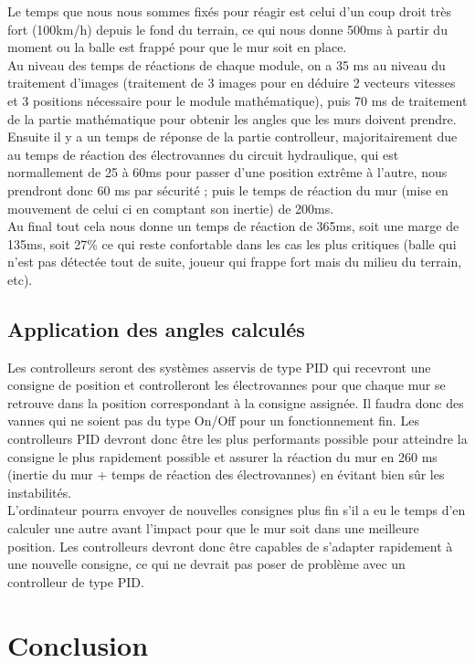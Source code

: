 Le temps que nous nous sommes fixés pour réagir est celui d'un coup droit très fort (100km/h) depuis le fond du terrain, ce qui nous donne 500ms à partir du moment ou la balle est frappé pour que le mur soit en place. \\
Au niveau des temps de réactions de chaque module, on a 35 ms au niveau du traitement d'images (traitement de 3 images pour en déduire 2 vecteurs vitesses et 3 positions nécessaire pour le module mathématique), puis 70 ms de traitement de la partie mathématique pour obtenir les angles que les murs doivent prendre. Ensuite il y a un temps de réponse de la partie controlleur, majoritairement due au temps de réaction des électrovannes du circuit hydraulique, qui est normallement de 25 à 60ms pour passer d'une position extrême à l'autre, nous prendront donc 60 ms par sécurité ; puis le temps de réaction du mur (mise en mouvement de celui ci en comptant son inertie) de 200ms.\\
Au final tout cela nous donne un temps de réaction de 365ms, soit une marge de 135ms, soit 27\% ce qui reste confortable dans les cas les plus critiques (balle qui n'est pas détectée tout de suite, joueur qui frappe fort mais du milieu du terrain, etc).

\section{Application des angles calculés}

Les controlleurs seront des systèmes asservis de type PID qui recevront une consigne de position et controlleront les électrovannes pour que chaque mur se retrouve dans la position correspondant à la consigne assignée. Il faudra donc des vannes qui ne soient pas du type On/Off pour un fonctionnement fin. Les controlleurs PID devront donc être les plus performants possible pour atteindre la consigne le plus rapidement possible et assurer la réaction du mur en 260 ms (inertie du mur + temps de réaction des électrovannes) en évitant bien sûr les instabilités.\\
L'ordinateur pourra envoyer de nouvelles consignes plus fin s'il a eu le temps d'en calculer une autre avant l'impact pour que le mur soit dans une meilleure position. Les controlleurs devront donc être capables de s'adapter rapidement à une nouvelle consigne, ce qui ne devrait pas poser de problème avec un controlleur de type PID.


\chapter{Conclusion}

